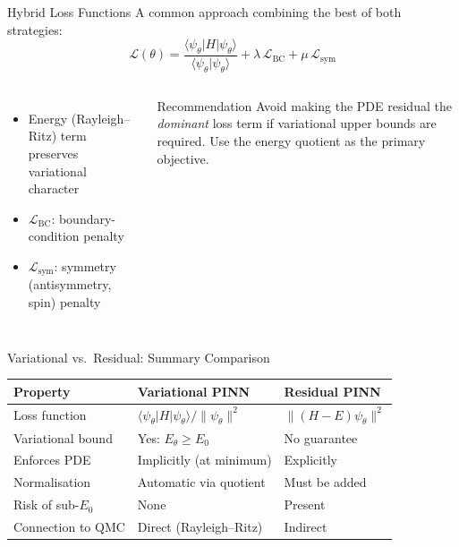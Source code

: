 \documentclass[aspectratio=169,10pt]{beamer}
\begin{document}
\begin{frame}{Hybrid Loss Functions}
  A common approach combining the best of both strategies:
  \[
    \mathcal{L}(\theta)
    = \frac{\langle\psi_\theta|H|\psi_\theta\rangle}
           {\langle\psi_\theta|\psi_\theta\rangle}
    + \lambda\,\mathcal{L}_{\text{BC}}
    + \mu\,\mathcal{L}_{\text{sym}}
  \]

  \begin{columns}[T]
      \begin{itemize}
        \item Energy (Rayleigh--Ritz) term preserves variational character
        \item $\mathcal{L}_{\text{BC}}$: boundary-condition penalty
        \item $\mathcal{L}_{\text{sym}}$: symmetry (antisymmetry, spin) penalty
      \end{itemize}
      \begin{block}{Recommendation}
        Avoid making the PDE residual the \emph{dominant} loss term
        if variational upper bounds are required.
        Use the energy quotient as the primary objective.
      \end{block}
  \end{columns}
\end{frame}

\begin{frame}{Variational vs.\ Residual: Summary Comparison}
  \renewcommand{\arraystretch}{1.35}
  \begin{tabular}{p{3.2cm} p{4.0cm} p{4.0cm}}
    \toprule
    \textbf{Property} & \textbf{Variational PINN} & \textbf{Residual PINN} \\
    \midrule
    Loss function      & $\langle\psi_\theta|H|\psi_\theta\rangle/\|\psi_\theta\|^2$
                       & $\|(H-E)\psi_\theta\|^2$ \\
    Variational bound  & \alert{Yes}: $E_\theta\geq E_0$ & No guarantee \\
    Enforces PDE       & Implicitly (at minimum)   & Explicitly \\
    Normalisation      & Automatic via quotient    & Must be added \\
    Risk of sub-$E_0$  & None                      & Present \\
    Connection to QMC  & Direct (Rayleigh--Ritz)   & Indirect \\
    \bottomrule
  \end{tabular}
\end{frame}
\end{document}
